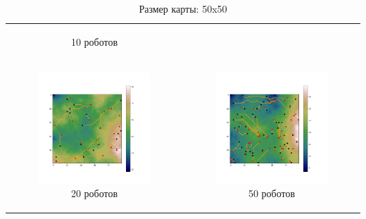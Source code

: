 \documentclass{article}
\numberwithin{equation}{section}
\begin{document}
\begin{table}[H]
\begin{tabular}{c c}
\begin{subfigure}{0.5\linewidth}
			\caption*{10 роботов}
			\end{subfigure}
			\\
            \begin{subfigure}{0.5\linewidth}
				\includegraphics[width = 1.0\columnwidth]{data/mean_paths/50x50/20.png}
			\caption*{20 роботов}
			\end{subfigure}
			&
			\begin{subfigure}{0.5\linewidth}
				\includegraphics[width = 1.0\columnwidth]{data/mean_paths/50x50/50.png}
			\caption*{50 роботов}
			\end{subfigure}
        \end{tabular}
        \caption*{Размер карты: 50x50}
	\end{table}
\end{document}
